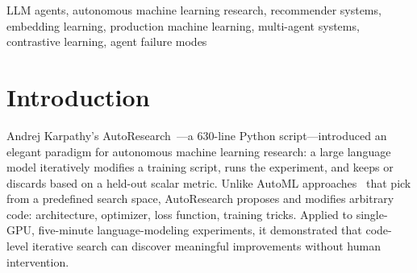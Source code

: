 \documentclass[conference]{IEEEtran}
\begin{document}
\begin{abstract}
Optimizing embedding systems for production recommendation pipelines demands systematic exploration that consumes disproportionate engineering effort at scale. We apply Andrej Karpathy's AutoResearch paradigm~\cite{karpathy2026autoresearch}---a large language model that iteratively edits a training script and retains modifications that improve a held-out scalar metric---to automate this exploration. We report on twelve weeks of running this paradigm at production scale, where iterations consume hours of multi-GPU compute, evaluation involves competing criteria, and campaigns span weeks across many training jobs. Across two independently developed representation-learning systems for a book recommendation pipeline, we ran 220+ experiments and observed five recurring failure modes absent from the original setting: infrastructure fragility, agent memory decay, search-direction stagnation, iteration-cost asymmetry, and metric fixation. We contribute a three-principle scaffolding design---prevent, persist, redirect---that maps each failure mode to a structural remedy and whose instantiation scales with iteration cost. The framework produced a 1.82$\times$ Recall@6 lift and a 2.1$\times$ coherence lift over hand-tuned baselines, and the agent autonomously designed a text-only fallback that expanded catalog coverage by 5.8$\times$. The two systems span nearly three orders of magnitude in per-iteration cost yet exhibit the same failure modes, suggesting these are structural properties of production-scale autonomous research rather than artifacts of either application.
\end{abstract}

\begin{IEEEkeywords}
LLM agents, autonomous machine learning research, recommender systems, embedding learning, production machine learning, multi-agent systems, contrastive learning, agent failure modes
\end{IEEEkeywords}

\section{Introduction}

Andrej Karpathy's AutoResearch~\cite{karpathy2026autoresearch}---a 630-line Python script---introduced an elegant paradigm for autonomous machine learning research: a large language model iteratively modifies a training script, runs the experiment, and keeps or discards based on a held-out scalar metric. Unlike AutoML approaches~\cite{akiba2019optuna} that pick from a predefined search space, AutoResearch proposes and modifies arbitrary code: architecture, optimizer, loss function, training tricks. Applied to single-GPU, five-minute language-modeling experiments, it demonstrated that code-level iterative search can discover meaningful improvements without human intervention.
\end{document}
